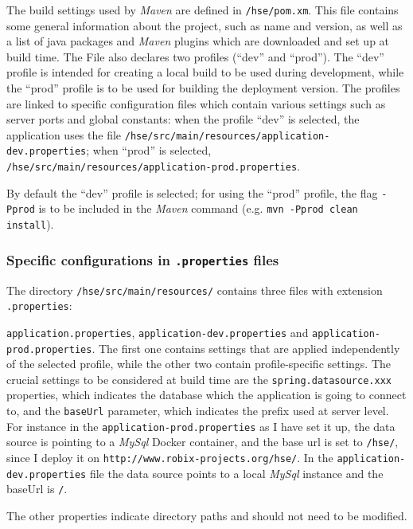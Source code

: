 \documentclass[fleqn]{article}
\begin{document}
The build settings used by \emph{Maven} are defined in \texttt{/hse/pom.xm}. This file contains some general information
about the project, such as name and version, as well as a list of java packages and \emph{Maven} plugins which are 
downloaded and set up at build time. The File also declares two profiles (``dev'' and ``prod''). The ``dev'' profile 
is intended for creating a local build to be used during development, while the ``prod'' profile is to be used for building the deployment version.
The profiles are linked to specific configuration files which contain various settings such as server ports and global
constants: when the profile ``dev'' is selected, the application uses the file \texttt{/hse/src/main/resources/application-dev.properties};
when ``prod'' is selected, \texttt{/hse/src/main/resources/application-prod.properties}. 

By default the ``dev'' profile is selected;
for using the ``prod'' profile, the flag \texttt{-Pprod} is to be included in the \emph{Maven} command 
(e.g. \texttt{mvn -Pprod clean install}).

\subsubsection{Specific configurations in \texttt{.properties} files}

The directory \texttt{/hse/src/main/resources/} contains three files with extension \texttt{.properties}:

\texttt{application.properties}, \texttt{application-dev.properties} and \texttt{application-prod.properties}.
The first one contains settings that are applied independently of the selected profile, while the other
two contain profile-specific settings. The crucial settings to be considered at build time are the 
\texttt{spring.datasource.xxx} properties, which indicates the database which the application is going to connect to, and 
the \texttt{baseUrl} parameter, which indicates the prefix used at server level.
For instance in the \texttt{application-prod.properties} as I have set it up, the data source is pointing to a \emph{MySql} Docker container,
and the base url is set to \texttt{/hse/}, since I deploy it on \texttt{http://www.robix-projects.org/hse/}. 
In the \texttt{application-dev.properties} file the data source points to a local \emph{MySql} instance and the baseUrl is \texttt{/}.

The other properties indicate directory paths and should not need to be modified.
\end{document}
